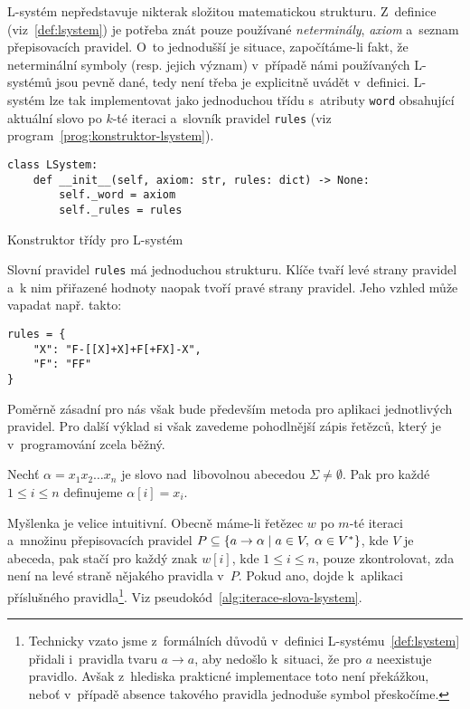 L-systém nepředstavuje nikterak složitou matematickou strukturu. Z~definice (viz~\ref{def:lsystem}) je potřeba znát pouze používané \emph{neterminály}, \emph{axiom} a~seznam přepisovacích pravidel. O~to jednodušší je situace, započítáme-li fakt, že neterminální symboly (resp. jejich význam) v~případě námi používaných L-systémů jsou pevně dané, tedy není třeba je explicitně uvádět v~definici. L-systém lze tak implementovat jako jednoduchou třídu s~atributy \texttt{word} obsahující aktuální slovo po $k$-té iteraci a~slovník pravidel \texttt{rules} (viz program~\ref{prog:konstruktor-lsystem}).
\begin{program}[h]
    \begin{lstlisting}[style=python]
class LSystem:
    def __init__(self, axiom: str, rules: dict) -> None:
        self._word = axiom
        self._rules = rules
\end{lstlisting}
    \caption{Konstruktor třídy pro L-systém}
    \label{prog:konstruktor-lsystem}
\end{program}
Slovní pravidel \texttt{rules} má jednoduchou strukturu. Klíče tvaří levé strany pravidel a~k nim přiřazené hodnoty naopak tvoří pravé strany pravidel. Jeho vzhled může vapadat např. takto:
\begin{verbatim}
rules = {
    "X": "F-[[X]+X]+F[+FX]-X",
    "F": "FF"
}
\end{verbatim}
Poměrně zásadní pro nás však bude především metoda pro aplikaci jednotlivých pravidel. Pro další výklad si však zavedeme pohodlnější zápis řetězců, který je v~programování zcela běžný.
\begin{definition}\label{def:index-retezce}
    Nechť $\alpha=x_1x_2\ldots x_n$ je slovo nad~libovolnou abecedou $\Sigma\neq\emptyset$. Pak pro každé $1\leqslant i\leqslant n$ definujeme $\alpha[i]=x_i$.
\end{definition}
Myšlenka je velice intuitivní. Obecně máme-li řetězec $w$ po $m$-té iteraci a~množinu přepisovacích pravidel $P\subseteq\left\{a\to\alpha\mid a\in V,\;\alpha\in V^*\right\}$, kde $V$ je abeceda, pak stačí pro každý znak $w[i]$, kde $1\leqslant i\leqslant n$, pouze zkontrolovat, zda není na levé straně nějakého pravidla v~$P$. Pokud ano, dojde k~aplikaci příslušného pravidla\footnote{Technicky vzato jsme z~formálních důvodů v~definici L-systému~\ref{def:lsystem} přidali i~pravidla tvaru $a\to a$, aby nedošlo k~situaci, že pro $a$ neexistuje pravidlo. Avšak z~hlediska prakticné implementace toto není překážkou, neboť v~případě absence takového pravidla jednoduše symbol přeskočíme.}. Viz pseudokód~\ref{alg:iterace-slova-lsystem}.
